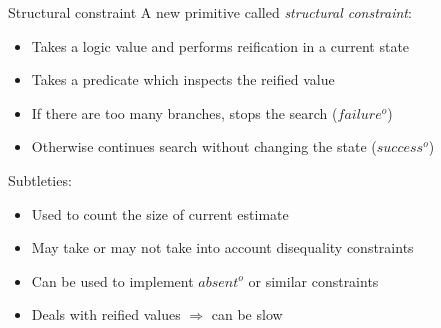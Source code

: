 \documentclass[aspectratio=169
  , xcolor={svgnames}
  , hyperref={ colorlinks,citecolor=Blue
             , linkcolor=DarkRed,urlcolor=DarkBlue}
  , russian
  ]{beamer}
\begin{document}
\begin{frame}{Structural constraint}
A new primitive called \emph{structural constraint}:
\begin{itemize}
\item Takes a logic value and performs reification in a current state
\item Takes a predicate which inspects the reified value 
\item If there are too many branches, stops the search ($failure^o$)
\item Otherwise continues search without changing the state ($success^o$)
\end{itemize}
\vspace{1em}
Subtleties:
\begin{itemize}
\item Used to count the size of current estimate
\item May take or may not take into account disequality constraints
\item Can be used to implement $absent^o$ or similar constraints
\item Deals with reified values $\Rightarrow$ can be slow
\end{itemize}
\end{frame}
\end{document}

